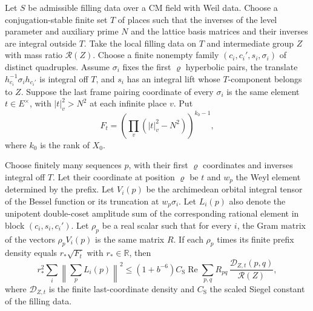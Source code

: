 \begin{lemma}
\label{lem:b-siegel-last-entry}
\emitthmsource
Let $S$ be admissible filling data over a CM field with Weil data. Choose a conjugation-stable finite set $T$ of places
such that the inverses of the level parameter and auxiliary prime $N$ and the lattice basis matrices and their inverses are integral outside $T$.
Take the local filling data on $T$ and intermediate group $Z$ with mass ratio $\mathcal R(Z)$.
Choose a finite nonempty family $(c_i,c_i',s_i,\sigma_i)$ of distinct quadruples.
Assume $\sigma_i$ fixes the first $\varrho$ hyperbolic pairs,
the translate $h_{c_i}^{-1}\sigma_i h_{c_i'}$ is integral off $T$,
and $s_i$ has an integral lift whose $T$-component belongs to $Z$.
Suppose the last frame pairing coordinate of every $\sigma_i$ is the same element $t\in E^\times$,
with $|t|_v^2>N^2$ at each infinite place $v$. Put
\[
 F_t=\left(\prod_v (|t|_v^2-N^2)\right)^{k_0-1},
\]
where $k_0$ is the rank of $X_0$.

Choose finitely many sequences $p$, with their first $\varrho$ coordinates and inverses integral off $T$.
Let their coordinate at position $\varrho$ be $t$ and $w_p$ the Weyl element determined by the prefix.
Let $V_i(p)$ be the archimedean orbital integral tensor of the Bessel function or its truncation at $w_p\sigma_i$.
Let $L_i(p)$ also denote the unipotent double-coset amplitude sum of the corresponding rational element in block $(c_i,s_i,c_i')$.
Let $\rho_p$ be a real scalar such that for every $i$, the Gram matrix of the vectors $\rho_pV_i(p)$
is the same matrix $R$. If each $\rho_p$ times its finite prefix density
equals $r_*\sqrt{F_t}$ with $r_*\in\mathbb R$, then
\[
 r_*^2\sum_i\left\|\sum_p L_i(p)\right\|^2
 \le (1+b^{-6})C_{\mathrm S}
       \operatorname{Re}\sum_{p,q}
           R_{pq}\,\frac{\mathcal D_{Z,t}(p,q)}{\mathcal R(Z)},
\]
where $\mathcal D_{Z,t}$ is the finite last-coordinate density and $C_{\mathrm S}$ the scaled Siegel constant of the filling data.
\end{lemma}

